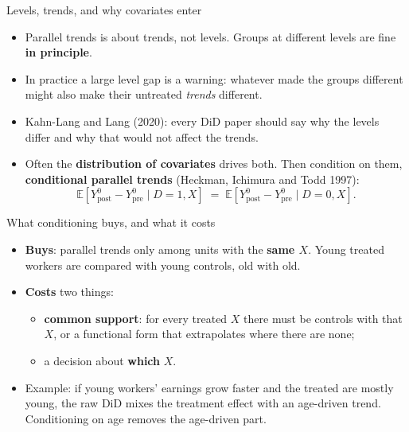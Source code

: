 \documentclass[
  11pt,
  ignorenonframetext,
  aspectratio=169,
]{beamer}
\newcounter{none} %
\providecommand{\tightlist}{%
  \setlength{\itemsep}{0pt}\setlength{\parskip}{0pt}}
\begin{document}
\begin{frame}{Levels, trends, and why covariates enter}
\protect{}\label{levels-trends-and-why-covariates-enter}
\begin{itemize}
\tightlist
\item
  Parallel trends is about trends, not levels. Groups at different
  levels are fine \textbf{in principle}.
\item
  In practice a large level gap is a warning: whatever made the groups
  different might also make their untreated \emph{trends} different.
\item
  Kahn-Lang and Lang (2020): every DiD paper should say why the levels
  differ and why that would not affect the trends.
\item
  Often the \textbf{distribution of covariates} drives both. Then
  condition on them, \textbf{conditional parallel trends} (Heckman,
  Ichimura and Todd 1997): \[
  \mathbb{E}[Y^0_{\text{post}} - Y^0_{\text{pre}} \mid D=1, X] \;=\; \mathbb{E}[Y^0_{\text{post}} - Y^0_{\text{pre}} \mid D=0, X].
  \]
\end{itemize}
\end{frame}

\begin{frame}{What conditioning buys, and what it costs}
\protect{}\label{what-conditioning-buys-and-what-it-costs}
\begin{itemize}
\tightlist
\item
  \textbf{Buys}: parallel trends only among units with the \textbf{same
  \(X\)}. Young treated workers are compared with young controls, old
  with old.
\item
  \textbf{Costs} two things:

  \begin{itemize}
  \tightlist
  \item
    \textbf{common support}: for every treated \(X\) there must be
    controls with that \(X\), or a functional form that extrapolates
    where there are none;
  \item
    a decision about \textbf{which} \(X\).
  \end{itemize}
\end{itemize}

\vspace{0.4em}

\begin{itemize}
\tightlist
\item
  Example: if young workers' earnings grow faster and the treated are
  mostly young, the raw DiD mixes the treatment effect with an
  age-driven trend. Conditioning on age removes the age-driven part.
\end{itemize}
\end{frame}
\end{document}
